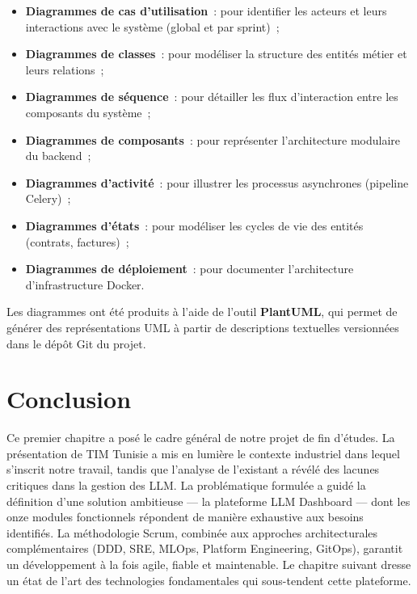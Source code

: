 \begin{itemize}[noitemsep]
    \item \textbf{Diagrammes de cas d'utilisation}~: pour identifier les acteurs et leurs interactions avec le système (global et par sprint)~;
    \item \textbf{Diagrammes de classes}~: pour modéliser la structure des entités métier et leurs relations~;
    \item \textbf{Diagrammes de séquence}~: pour détailler les flux d'interaction entre les composants du système~;
    \item \textbf{Diagrammes de composants}~: pour représenter l'architecture modulaire du backend~;
    \item \textbf{Diagrammes d'activité}~: pour illustrer les processus asynchrones (pipeline Celery)~;
    \item \textbf{Diagrammes d'états}~: pour modéliser les cycles de vie des entités (contrats, factures)~;
    \item \textbf{Diagrammes de déploiement}~: pour documenter l'architecture d'infrastructure Docker.
\end{itemize}

Les diagrammes ont été produits à l'aide de l'outil \textbf{PlantUML}, qui permet de générer des représentations UML à partir de descriptions textuelles versionnées dans le dépôt Git du projet.


\section*{Conclusion}

Ce premier chapitre a posé le cadre général de notre projet de fin d'études. La présentation de TIM Tunisie a mis en lumière le contexte industriel dans lequel s'inscrit notre travail, tandis que l'analyse de l'existant a révélé des lacunes critiques dans la gestion des LLM. La problématique formulée a guidé la définition d'une solution ambitieuse --- la plateforme LLM Dashboard --- dont les onze modules fonctionnels répondent de manière exhaustive aux besoins identifiés. La méthodologie Scrum, combinée aux approches architecturales complémentaires (DDD, SRE, MLOps, Platform Engineering, GitOps), garantit un développement à la fois agile, fiable et maintenable. Le chapitre suivant dresse un état de l'art des technologies fondamentales qui sous-tendent cette plateforme.
